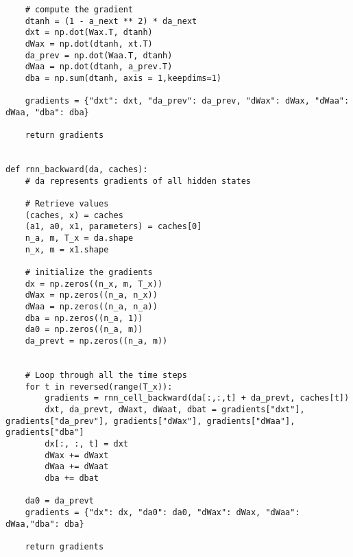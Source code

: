 \documentclass{article}
\begin{document}
\begin{lstlisting}
    # compute the gradient 
    dtanh = (1 - a_next ** 2) * da_next
    dxt = np.dot(Wax.T, dtanh)
    dWax = np.dot(dtanh, xt.T)
    da_prev = np.dot(Waa.T, dtanh)
    dWaa = np.dot(dtanh, a_prev.T)
    dba = np.sum(dtanh, axis = 1,keepdims=1)

    gradients = {"dxt": dxt, "da_prev": da_prev, "dWax": dWax, "dWaa": dWaa, "dba": dba}

    return gradients


def rnn_backward(da, caches):
    # da represents gradients of all hidden states
    
    # Retrieve values 
    (caches, x) = caches
    (a1, a0, x1, parameters) = caches[0]
    n_a, m, T_x = da.shape
    n_x, m = x1.shape

    # initialize the gradients 
    dx = np.zeros((n_x, m, T_x))
    dWax = np.zeros((n_a, n_x))
    dWaa = np.zeros((n_a, n_a))
    dba = np.zeros((n_a, 1))
    da0 = np.zeros((n_a, m))
    da_prevt = np.zeros((n_a, m))


    # Loop through all the time steps
    for t in reversed(range(T_x)):
        gradients = rnn_cell_backward(da[:,:,t] + da_prevt, caches[t])
        dxt, da_prevt, dWaxt, dWaat, dbat = gradients["dxt"], gradients["da_prev"], gradients["dWax"], gradients["dWaa"], gradients["dba"]
        dx[:, :, t] = dxt
        dWax += dWaxt
        dWaa += dWaat
        dba += dbat

    da0 = da_prevt
    gradients = {"dx": dx, "da0": da0, "dWax": dWax, "dWaa": dWaa,"dba": dba}
    
    return gradients

\end{lstlisting}
\end{document}
